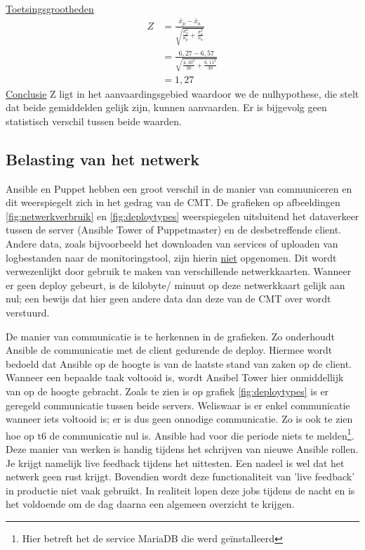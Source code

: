 \underline{Toetsingsgrootheden}
\begin{equation} \label{eq1}
\begin{split}
Z &= \tfrac{\bar x_p - \bar x_a}{\sqrt{\tfrac{\sigma_p^2}{n_p}+\tfrac{\sigma_a^2}{n_a}}}\\
& = \tfrac{ 6,27 - 6,57}{\sqrt{\tfrac{ 4,10 ^2}{30}+\tfrac{ 6,11^2}{30}}} \\
& = 1,27
\end{split}
\end{equation}
\underline{Conclusie}\newline
Z ligt in het aanvaardingsgebied waardoor we de nulhypothese, die stelt dat beide gemiddelden gelijk zijn, kunnen aanvaarden. Er is bijgevolg geen statistisch verschil tussen beide waarden.

\subsection{Belasting van het netwerk}

Ansible en Puppet hebben een groot verschil in de manier van communiceren en dit weerspiegelt zich in het gedrag van de \gls{CMT}. De grafieken op afbeeldingen \ref{fig:netwerkverbruik} en \ref{fig:deploytypes} weerspiegelen uitsluitend het dataverkeer tussen de server (Ansible Tower of Puppetmaster) en de desbetreffende client. Andere data, zoals bijvoorbeeld het downloaden van services of uploaden van logbestanden naar de monitoringstool, zijn hierin \underline{niet} opgenomen. Dit wordt verwezenlijkt door gebruik te maken van verschillende netwerkkaarten. Wanneer er geen deploy gebeurt, is de kilobyte/ minuut op deze netwerkkaart gelijk aan nul; een bewijs dat hier geen andere data dan deze van de \gls{CMT} over wordt verstuurd.  \newline

De manier van communicatie is te herkennen in de grafieken. Zo onderhoudt Ansible de communicatie met de client gedurende de deploy. Hiermee wordt bedoeld dat Ansible op de hoogte is van de laatste stand van zaken op de client. Wanneer een bepaalde taak voltooid is, wordt Ansibel Tower hier onmiddellijk van op de hoogte gebracht. Zoals te zien is op grafiek \ref{fig:deploytypes} is er geregeld communicatie tussen beide servers. Weliswaar is er enkel communicatie wanneer iets voltooid is; er is dus geen onnodige communicatie. Zo is ook te zien hoe op t6 de communicatie nul is. Ansible had voor die periode niets te melden\footnote{Hier betreft het de service MariaDB die werd ge\"installeerd}. \newline
 Deze manier van werken is handig tijdens het schrijven van nieuwe Ansible rollen. Je krijgt namelijk live feedback tijdens het uittesten. Een nadeel is wel dat het netwerk geen rust krijgt. Bovendien wordt deze functionaliteit van 'live feedback' in productie niet vaak gebruikt. In realiteit lopen deze jobs tijdens de nacht en is het voldoende om de dag daarna een algemeen overzicht te krijgen.\newline

